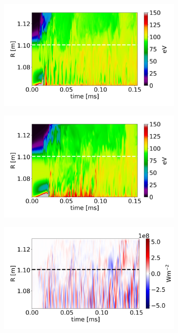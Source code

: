 \begin{figure}[H]\centering
	\begin{subfigure}[t]{0.45\textwidth}
		\centering
		\includegraphics[width=1\textwidth]{schemes/plotOMPtime_spec1_T_PHIAJ_beta_1.jpg}
	\end{subfigure}
	\begin{subfigure}[t]{0.45\textwidth}
		\centering
		\includegraphics[width=1\textwidth]{schemes/plotOMPtime_spec1_T_flutter.jpg}
	\end{subfigure}
	\begin{subfigure}[t]{0.45\textwidth}
		\centering
		\includegraphics[width=1\textwidth]{schemes/plotOMPtime_spec1_fluxE_psi_PHIAJ_beta_1.jpg}

\end{subfigure}
\end{figure}
